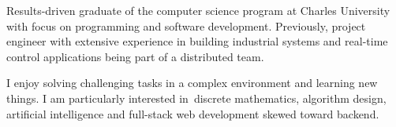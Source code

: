 Results-driven graduate of the computer science program at Charles University with focus on programming and software development. Previously, project engineer with extensive experience in building industrial systems and real-time control applications being part of a distributed team.

I enjoy solving challenging tasks in a complex environment and learning new things. I am particularly interested in~dis\-crete mathematics, algorithm design, artificial intelligence and full-stack web development skewed toward backend.
